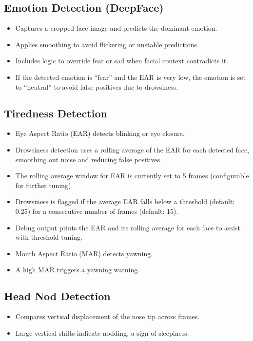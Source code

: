 \documentclass[12pt]{article}
\begin{document}
\subsection{Emotion Detection (DeepFace)}
\begin{itemize}
    \item Captures a cropped face image and predicts the dominant emotion.
    \item Applies smoothing to avoid flickering or unstable predictions.
    \item Includes logic to override fear or sad when facial context contradicts it.
    \item If the detected emotion is ``fear'' and the EAR is very low, the emotion is set to ``neutral'' to avoid false positives due to drowsiness.
\end{itemize}
\subsection{Tiredness Detection}
\begin{itemize}
    \item Eye Aspect Ratio (EAR) detects blinking or eye closure.
    \item Drowsiness detection uses a rolling average of the EAR for each detected face, smoothing out noise and reducing false positives.
    \item The rolling average window for EAR is currently set to 5 frames (configurable for further tuning).
    \item Drowsiness is flagged if the average EAR falls below a threshold (default: 0.25) for a consecutive number of frames (default: 15).
    \item Debug output prints the EAR and its rolling average for each face to assist with threshold tuning.
    \item Mouth Aspect Ratio (MAR) detects yawning.
    \item A high MAR triggers a yawning warning.
\end{itemize}
\subsection{Head Nod Detection}
\begin{itemize}
    \item Compares vertical displacement of the nose tip across frames.
    \item Large vertical shifts indicate nodding, a sign of sleepiness.
\end{itemize}
\end{document}
